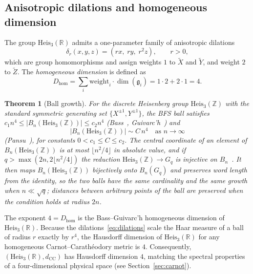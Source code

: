 \documentclass[11pt,a4paper]{article}
\newtheorem{theorem}{Theorem}[section]
\theoremstyle{definition}
\theoremstyle{remark}
\newcommand{\HeisR}{\mathrm{Heis}_3(\mathbb{R})}
\newcommand{\HeisZZ}{\mathrm{Heis}_3(\mathbb{Z})}
\newcommand{\dCC}{d_{\mathrm{CC}}}
\newcommand{\Gq}{G_q}
\newcommand{\Bn}{B_n}
\newcommand{\Dhom}{D_{\mathrm{hom}}}
\begin{document}
  \subsection{Anisotropic dilations and homogeneous dimension}

    The group $\HeisR$ admits a one-parameter family of anisotropic dilations
    \begin{equation}
      \delta_r(x, y, z) = (r x,\; r y,\; r^2 z), \qquad r > 0,
      \label{eq:dilations}
    \end{equation}
    which are group homomorphisms and assign weights $1$ to $\tilde X$ and $\tilde Y$,
    and weight $2$ to $\tilde Z$.
    The \emph{homogeneous dimension} is defined as
    \begin{equation}
      \Dhom = \sum_i \mathrm{weight}_i \cdot \dim(\mathfrak{g}_i)
      = 1 \cdot 2 + 2 \cdot 1 = 4.
      \label{eq:dhom}
    \end{equation}

    \begin{theorem}[Ball growth]
      \label{thm:bass}
      For the discrete Heisenberg group $\HeisZZ$ with the standard symmetric generating set
      $\{X^{\pm 1}, Y^{\pm 1}\}$, the BFS ball satisfies $c_1 n^4 \le |B_n(\HeisZZ)| \le c_2 n^4$
      (Bass~\cite{Bass1972}, Guivarc'h~\cite{Guivarch1973}) and
      \begin{equation}
        |B_n(\HeisZZ)| \sim C \, n^4 \quad \text{as } n \to \infty
      \end{equation}
      (Pansu~\cite{Pansu1983}), for constants $0 < c_1 \le C \le c_2$.
      The central coordinate of an element of $B_n(\HeisZZ)$ is at most $\lfloor n^2/4\rfloor$ in absolute value, and
      if $q > \max(2n, 2\lfloor n^2/4\rfloor)$ the reduction $\HeisZZ \to \Gq$ is injective on
      $B_n$~\cite{Beau2026ccnote}.
      It then maps $B_n(\HeisZZ)$ bijectively onto $\Bn(\Gq)$ and preserves word length from the identity, so the
      two balls have the same cardinality and the same growth when $n \ll \sqrt q$; distances between arbitrary points
      of the ball are preserved when the condition holds at radius $2n$.
    \end{theorem}

    The exponent $4 = \Dhom$ is the Bass--Guivarc'h homogeneous dimension of $\HeisR$.
    Because the dilations~\eqref{eq:dilations} scale the Haar measure of a ball of radius $r$ exactly by $r^4$,
    the Hausdorff dimension of $\HeisR$ for any homogeneous Carnot--Carath\'eodory metric is $4$.
    Consequently, $(\HeisR, \dCC)$ has Hausdorff dimension $4$, matching the spectral
    properties of a four-dimensional physical space (see Section~\ref{sec:carnot}).
\end{document}
